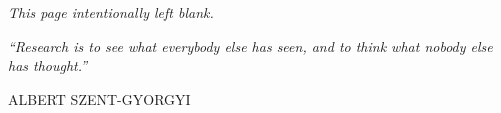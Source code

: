 



\newlength\longest



  


  

  \newpage
  \vspace*{\fill}
  \hfill
  \begin{center}
    \Large\textit{This page intentionally left blank.}
  \end{center}
  \vspace{\fill}
  \thispagestyle{empty}
  \newpage

  \maketitle

  \begingroup
  \thispagestyle{empty}
  \null\vfill

  \centering
  \parbox{0.6\linewidth}{%
    \raggedright{\Large\itshape%
     ``Research is to see what everybody else has seen, and to think what nobody
     else has thought.''\par\vspace{1ex}
    }%
    \raggedleft\large\MakeUppercase{Albert Szent-Gyorgyi}\par%
  }

  \vfill\vfill

  \clearpage
  \endgroup

  
  \vspace{5mm}
  

  \begingroup
    \let\clearpage\relax
    \let\cleardoublepage\relax
    \tableofcontents
  \endgroup

  \cleardoublepage%

  \begingroup
    \let\clearpage\relax
    \let\cleardoublepage\relax
  \endgroup

  \cleardoublepage{}

